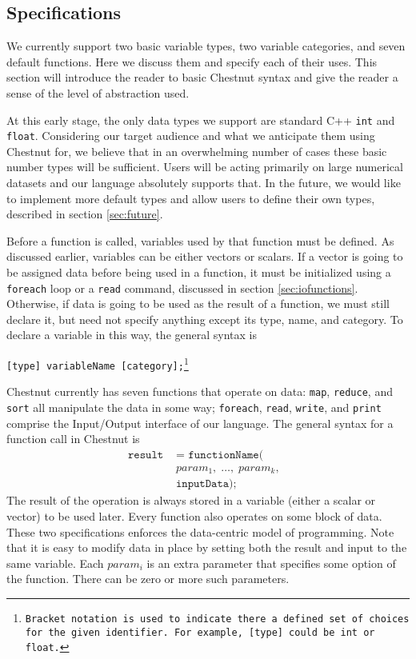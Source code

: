 \documentclass[twocolumn]{article}
\renewcommand{\|}{\origbar} %
\newcommand{\code}[1]{\texttt{#1}}
\begin{document}
\subsection{Specifications}
\label{sec:specifications}

We currently support two basic variable types, two variable categories, and seven default functions. Here we discuss them and specify each of their uses. This section will introduce the reader to basic Chestnut syntax and give the reader a sense of the level of abstraction used.

At this early stage, the only data types we support are standard C++ \code{int} and \code{float}. Considering our target audience and what we anticipate them using Chestnut for, we believe that in an overwhelming number of cases these basic number types will be sufficient. Users will be acting primarily on large numerical datasets and our language absolutely supports that. In the future, we would like to implement more default types and allow users to define their own types, described in section \ref{sec:future}. 

Before a function is called, variables used by that function must be defined. As discussed earlier, variables can be either vectors or scalars. If a vector is going to be assigned data before being used in a function, it must be initialized using a \code{foreach} loop or a \code{read} command, discussed in section \ref{sec:iofunctions}. Otherwise, if data is going to be used as the result of a function, we must still declare it, but need not specify anything except its type, name, and category. To declare a variable in this way, the general syntax is
\begin{center}
  \code{[type] variableName [category];\footnote{Bracket notation is used to indicate there a defined set of choices for the given identifier. For example, \code{[type]} could be \code{int} or \code{float}.}}
\end{center}

Chestnut currently has seven functions that operate on data: \code{map}, \code{reduce}, and \code{sort} all manipulate the data in some way; \code{foreach}, \code{read}, \code{write}, and \code{print} comprise the Input/Output interface of our language. The general syntax for a function call in Chestnut is
\begin{align*}
  \code{result } &\code{= functionName(} \\ &\code{$param_1,\;\ldots, \;param_k,$ } \\ &\code{inputData);}
\end{align*}
The result of the operation is always stored in a variable (either a scalar or vector) to be used later. Every function also operates on some block of data. These two specifications enforces the data-centric model of programming. Note that it is easy to modify data in place by setting both the result and input to the same variable. Each $param_i$ is an extra parameter that specifies some option of the function. There can be zero or more such parameters. 
\end{document}
